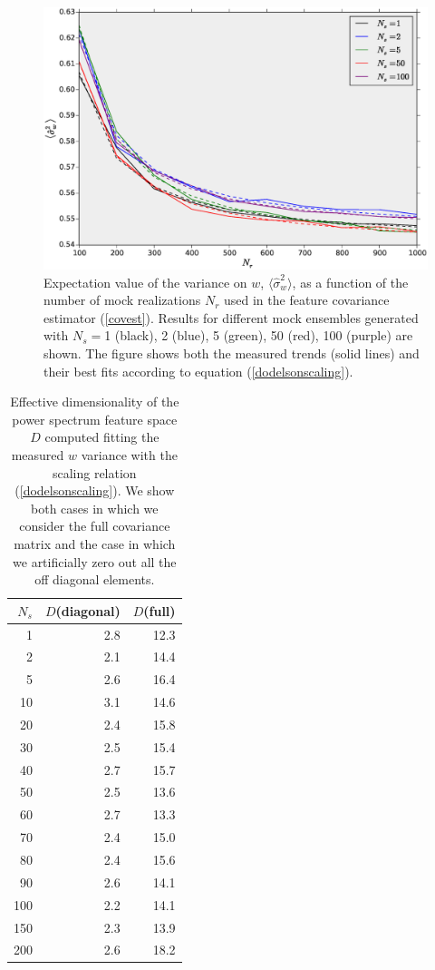 \documentclass[reprint,aps,prd,superscriptaddress,showkeys,showpacs]{revtex4-1}
\newcommand{\h}[1]{\hat{#1}}
\begin{document}
\begin{figure}
\includegraphics[scale=0.3]{Figures/scaling_nr.eps}
\caption{Expectation value of the variance on $w$, $\langle\h{\sigma}^2_w\rangle$, as a function of the number of mock realizations $N_r$ used in the feature covariance estimator (\ref{covest}). Results for different mock ensembles generated with $N_s=$1 (black), 2 (blue), 5 (green), 50 (red), 100 (purple) are shown. The figure shows both the measured trends (solid lines) and their best fits according to equation (\ref{dodelsonscaling}). }
\label{wvar_nr}
\end{figure}

\begin{table}
\begin{center}
\begin{tabular}{r|rr}
\toprule
 $N_s$ &  $D$(diagonal) &  $D$(full) \\ \hline
\midrule
    1 &   2.8 &  12.3 \\
    2 &   2.1 &  14.4 \\
    5 &   2.6 &  16.4 \\
   10 &   3.1 &  14.6 \\
   20 &   2.4 &  15.8 \\
   30 &   2.5 &  15.4 \\
   40 &   2.7 &  15.7 \\
   50 &   2.5 &  13.6 \\
   60 &   2.7 &  13.3 \\
   70 &   2.4 &  15.0 \\
   80 &   2.4 &  15.6 \\
   90 &   2.6 &  14.1 \\
  100 &   2.2 &  14.1 \\
  150 &   2.3 &  13.9 \\
  200 &   2.6 &  18.2 \\
\bottomrule
\end{tabular}
\end{center}
\caption{Effective dimensionality of the power spectrum feature space $D$ computed fitting the measured $w$ variance with the scaling relation (\ref{dodelsonscaling}). We show both cases in which we consider the full covariance matrix and the case in which we artificially zero out all the off diagonal elements.}
\label{dimtable}
\end{table}
\end{document}
